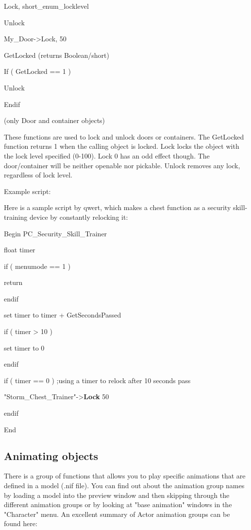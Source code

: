 \documentclass[
]{article}
\begin{document}
Lock, short\_enum\_locklevel

Unlock

My\_Door-\textgreater Lock, 50

GetLocked (returns Boolean/short)

If ( GetLocked == 1 )

Unlock

Endif

(only Door and container objects)

These functions are used to lock and unlock doors or containers. The
GetLocked function returns 1 when the calling object is locked. Lock
locks the object with the lock level specified (0-100). Lock 0 has an
odd effect though. The door/container will be neither openable nor
pickable. Unlock removes any lock, regardless of lock level.

Example script:

Here is a sample script by qwert, which makes a chest function as a
security skill-training device by constantly relocking it:

Begin PC\_Security\_Skill\_Trainer

float timer

if ( menumode == 1 )

return

endif

set timer to timer + GetSecondsPassed

if ( timer \textgreater{} 10 )

set timer to 0

endif

if ( timer == 0 ) ;using a timer to relock after 10 seconds pass

"Storm\_Chest\_Trainer"-\textgreater{}\textbf{Lock} 50

endif

End

\hypertarget{animating-objects}{%
\subsection{Animating objects}\label{animating-objects}}

There is a group of functions that allows you to play specific
animations that are defined in a model (.nif file). You can find out
about the animation group names by loading a model into the preview
window and then skipping through the different animation groups or by
looking at "base animation" windows in the "Character" menu. An
excellent summary of Actor animation groups can be found here:
\end{document}
